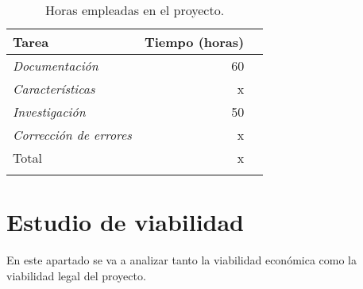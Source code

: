 \begin{longtable}[]{@{}lrr@{}}
\toprule
\begin{minipage}[b]{0.37\columnwidth}\raggedright\strut
Tarea\strut
\end{minipage} & \begin{minipage}[b]{0.37\columnwidth}\raggedleft\strut
Tiempo (horas)\strut
\end{minipage}\tabularnewline
\midrule
\endhead
\begin{minipage}[t]{0.37\columnwidth}\raggedright\strut
\emph{Documentación}\strut
\end{minipage} & \begin{minipage}[t]{0.37\columnwidth}\raggedleft\strut
60\strut
\end{minipage}\tabularnewline
\begin{minipage}[t]{0.37\columnwidth}\raggedright\strut
\emph{Características}\strut
\end{minipage} & \begin{minipage}[t]{0.37\columnwidth}\raggedleft\strut
x\strut
\end{minipage}\tabularnewline
\begin{minipage}[t]{0.37\columnwidth}\raggedright\strut
\emph{Investigación}\strut
\end{minipage}& \begin{minipage}[t]{0.37\columnwidth}\raggedleft\strut
50\strut
\end{minipage}\tabularnewline
\begin{minipage}[t]{0.37\columnwidth}\raggedright\strut
\emph{Corrección de errores}\strut
\end{minipage} & \begin{minipage}[t]{0.37\columnwidth}\raggedleft\strut
x\strut
\end{minipage}\tabularnewline
\midrule
\begin{minipage}[t]{0.37\columnwidth}\raggedright\strut
Total\strut
\end{minipage} & \begin{minipage}[t]{0.37\columnwidth}\raggedleft\strut
x\strut
\end{minipage}\tabularnewline
\bottomrule
\caption{Horas empleadas en el proyecto.}
\end{longtable}




\section{Estudio de viabilidad}
En este apartado se va a analizar tanto la viabilidad económica como la viabilidad legal del proyecto.


